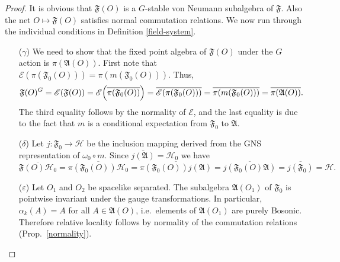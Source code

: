 \documentclass[12pt]{article}
\newcommand{\alg}[1]{\mathfrak{#1}}
\theoremstyle{definition}
\theoremstyle{definition}
\theoremstyle{remark}
\newcommand{\ve}{\varepsilon}
\def\2#1{{\mathcal #1}}
\def\4#1{{\mathscr #1}}
\def\al#1{{\mathfrak #1}}
\def\a{\alpha} \def\b{\beta} \def\g{\gamma} \def\d{\delta}
\def\om{\omega} \def\Om{\Omega} \def\dd{\partial} \def\D{\Delta}
\begin{document}
\begin{proof} It is obvious that $\al F(O)$ is a
  $G$-stable von Neumann subalgebra of $\al F$.  Also
  the net $O\mapsto \al F(O)$ satisfies normal
  commutation relations.  We now run through the
  individual conditions in Definition
  \ref{field-system}.

  \begin{enumerate}

  \item[($\g$)] We need to show that the fixed
    point algebra of $\al F(O)$ under the $G$ action is
    $\pi (\al A(O))$.  First note that $\4E (\pi (\al
    F_0(O)))=\pi (m(\al F_0(O)))$.  Thus,
\[ \al F(O)^{G}=\4E (\al F(O))=\4E \Bigl(\overline{\pi
  (\al F_0(O))}\Bigr)=\overline{\4E (\pi (\al
  F_0(O)))}= \overline{\pi (m(\al F_0(O)))
}=\overline{\pi (\al A(O))} .
\] The third equality follows by the normality of
$\4E$, and the last equality is due to the fact that
$m$ is a conditional expectation from $\al F_0$ to $\al
A$.


\item[($\d$)] Let $j:\al F_0\to \2H$ be the
  inclusion mapping derived from the GNS representation
  of $\om _0\circ m$.  Since $\overline{j(\alg{A})}=\2H
  _0$ we have
$$ \overline{\alg{F}(O)\2H _0}=\overline{\pi (\alg{F}_0(O))\2H
  _0}=\overline{\pi
  (\alg{F}_0(O))j(\alg{A})}=\overline{j(\alg{F}_0(O)\alg{A})}=\overline{j(\alg{F}_0)}=\2H
.$$

\item[($\ve$)] Let $O_1$ and $O_2$ be spacelike separated.  The
  subalgebra $\alg{A}(O _1)$ of $\alg{F}_0$ is pointwise invariant
  under the gauge transformations. In particular, $\a _k(A)=A$ for all
  $A\in \alg{A}(O)$, i.e.\ elements of $\alg{A}(O_1)$ are purely
  Bosonic.  Therefore relative locality follows by normality of the
  commutation relations (Prop.\ \ref{normality}).

\end{enumerate}


\end{proof}
\end{document}
